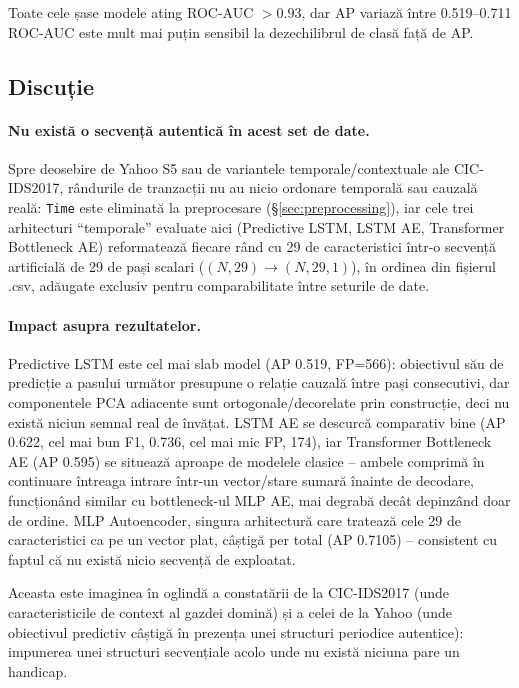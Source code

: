 Toate cele șase modele ating ROC-AUC $>0.93$, dar AP variază între 0.519--0.711 \rightarrow ROC-AUC este mult mai puțin sensibil la dezechilibrul de clasă față de AP.

\subsection{Discuție}

\paragraph{Nu există o secvență autentică în acest set de date.} Spre deosebire de Yahoo S5 sau de variantele temporale/contextuale ale CIC-IDS2017, rândurile de tranzacții nu au nicio ordonare temporală sau cauzală reală: \texttt{Time} este eliminată la preprocesare (\S\ref{sec:preprocessing}), iar cele trei arhitecturi \enquote{temporale} evaluate aici (Predictive LSTM, LSTM AE, Transformer Bottleneck AE) reformatează fiecare rând cu 29 de caracteristici într-o secvență artificială de 29 de pași scalari ($(N,29) \to (N,29,1)$), în ordinea din fișierul .csv, adăugate exclusiv pentru comparabilitate între seturile de date.

\paragraph{Impact asupra rezultatelor.} Predictive LSTM este cel mai slab model (AP 0.519, FP=566): obiectivul său de predicție a pasului următor presupune o relație cauzală între pași consecutivi, dar componentele PCA adiacente sunt ortogonale/decorelate prin construcție, deci nu există niciun semnal real de învățat.
LSTM AE se descurcă comparativ bine (AP 0.622, cel mai bun F1, 0.736, cel mai mic FP, 174), iar Transformer Bottleneck AE (AP 0.595) se situează aproape de modelele clasice -- ambele comprimă în continuare întreaga intrare într-un vector/stare sumară înainte de decodare, funcționând similar cu bottleneck-ul MLP AE, mai degrabă decât depinzând doar de ordine.
MLP Autoencoder, singura arhitectură care tratează cele 29 de caracteristici ca pe un vector plat, câștigă per total (AP 0.7105) -- consistent cu faptul că nu există nicio secvență de exploatat.

Aceasta este imaginea în oglindă a constatării de la CIC-IDS2017 (unde caracteristicile de context al gazdei domină) și a celei de la Yahoo (unde obiectivul predictiv câștigă în prezența unei structuri periodice autentice): impunerea unei structuri secvențiale acolo unde nu există niciuna pare un handicap.

